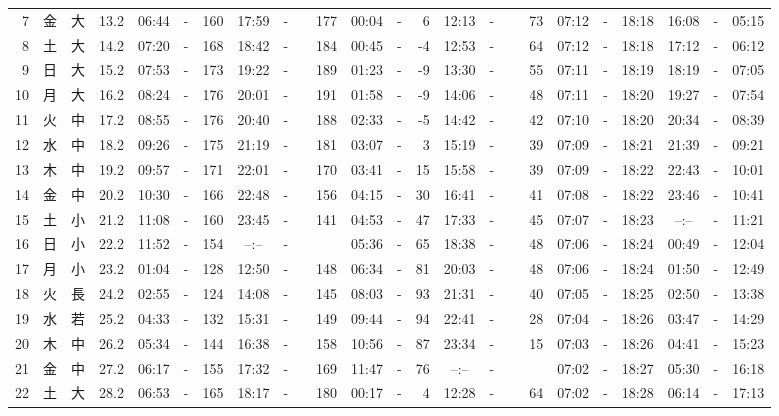\documentclass[12pt,a4j]{jsarticle}
\begin{document}
\begin{table}[htbp]
\begin{center}
{\begin{tabular}{|rc|cr|ccrccr|ccrccr|ccc|ccc|}
 7 & 金 & 大 & 13.2 &  06:44 &-& 160 &  17:59 &-& 177 &  00:04 &-&   6 &  12:13 &-&  73 & 07:12 & -& 18:18 & 16:08 & -& 05:15 \\
 8 & 土 & 大 & 14.2 &  07:20 &-& 168 &  18:42 &-& 184 &  00:45 &-&  -4 &  12:53 &-&  64 & 07:12 & -& 18:18 & 17:12 & -& 06:12 \\
 9 & 日 & 大 & 15.2 &  07:53 &-& 173 &  19:22 &-& 189 &  01:23 &-&  -9 &  13:30 &-&  55 & 07:11 & -& 18:19 & 18:19 & -& 07:05 \\
10 & 月 & 大 & 16.2 &  08:24 &-& 176 &  20:01 &-& 191 &  01:58 &-&  -9 &  14:06 &-&  48 & 07:11 & -& 18:20 & 19:27 & -& 07:54 \\
11 & 火 & 中 & 17.2 &  08:55 &-& 176 &  20:40 &-& 188 &  02:33 &-&  -5 &  14:42 &-&  42 & 07:10 & -& 18:20 & 20:34 & -& 08:39 \\
12 & 水 & 中 & 18.2 &  09:26 &-& 175 &  21:19 &-& 181 &  03:07 &-&   3 &  15:19 &-&  39 & 07:09 & -& 18:21 & 21:39 & -& 09:21 \\
13 & 木 & 中 & 19.2 &  09:57 &-& 171 &  22:01 &-& 170 &  03:41 &-&  15 &  15:58 &-&  39 & 07:09 & -& 18:22 & 22:43 & -& 10:01 \\
14 & 金 & 中 & 20.2 &  10:30 &-& 166 &  22:48 &-& 156 &  04:15 &-&  30 &  16:41 &-&  41 & 07:08 & -& 18:22 & 23:46 & -& 10:41 \\
15 & 土 & 小 & 21.2 &  11:08 &-& 160 &  23:45 &-& 141 &  04:53 &-&  47 &  17:33 &-&  45 & 07:07 & -& 18:23 & --:-- & -& 11:21 \\
16 & 日 & 小 & 22.2 &  11:52 &-& 154 &  --:-- &-&~~~~~ &  05:36 &-&  65 &  18:38 &-&  48 & 07:06 & -& 18:24 & 00:49 & -& 12:04 \\
17 & 月 & 小 & 23.2 &  01:04 &-& 128 &  12:50 &-& 148 &  06:34 &-&  81 &  20:03 &-&  48 & 07:06 & -& 18:24 & 01:50 & -& 12:49 \\
18 & 火 & 長 & 24.2 &  02:55 &-& 124 &  14:08 &-& 145 &  08:03 &-&  93 &  21:31 &-&  40 & 07:05 & -& 18:25 & 02:50 & -& 13:38 \\
19 & 水 & 若 & 25.2 &  04:33 &-& 132 &  15:31 &-& 149 &  09:44 &-&  94 &  22:41 &-&  28 & 07:04 & -& 18:26 & 03:47 & -& 14:29 \\
20 & 木 & 中 & 26.2 &  05:34 &-& 144 &  16:38 &-& 158 &  10:56 &-&  87 &  23:34 &-&  15 & 07:03 & -& 18:26 & 04:41 & -& 15:23 \\
21 & 金 & 中 & 27.2 &  06:17 &-& 155 &  17:32 &-& 169 &  11:47 &-&  76 &  --:-- &-&~~~~~ & 07:02 & -& 18:27 & 05:30 & -& 16:18 \\
22 & 土 & 大 & 28.2 &  06:53 &-& 165 &  18:17 &-& 180 &  00:17 &-&   4 &  12:28 &-&  64 & 07:02 & -& 18:28 & 06:14 & -& 17:13 \\

\end{tabular}}
\end{center}
\end{table}
\end{document}
